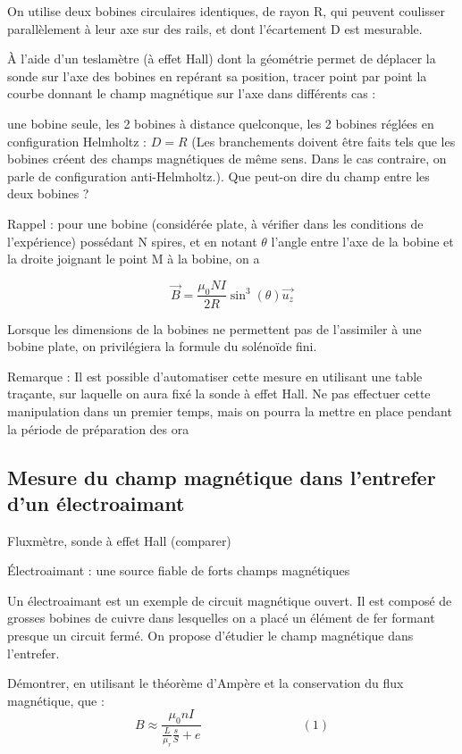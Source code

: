 \documentclass{article}%
\begin{document}
On utilise deux bobines circulaires identiques, de rayon R, qui peuvent coulisser parallèlement à leur axe sur des rails, et dont l'écartement D est mesurable.

À l'aide d'un teslamètre (à effet Hall) dont la géométrie permet de déplacer la sonde sur l'axe des bobines en repérant sa position, tracer point par point la courbe donnant le champ magnétique sur l'axe dans différents cas :

    une bobine seule,
    les 2 bobines à distance quelconque,
    les 2 bobines réglées en configuration Helmholtz : $D = R$ (Les branchements doivent être faits tels que les bobines créent des champs magnétiques de même sens. Dans le cas contraire, on parle de configuration anti-Helmholtz.). Que peut-on dire du champ entre les deux bobines ?

Rappel : pour une bobine (considérée plate, à vérifier dans les conditions de l'expérience) possédant N spires, et en notant $\theta$ l'angle entre l'axe de la bobine et la droite joignant le point M à la bobine, on a

\[\vec B = \frac{\mu_0 NI}{2 R}\sin^3(\theta) \vec{u_z}\]

Lorsque les dimensions de la bobines ne permettent pas de l'assimiler à une bobine plate, on privilégiera la formule du solénoïde fini.

Remarque : Il est possible d'automatiser cette mesure en utilisant une table traçante, sur laquelle on aura fixé la sonde à effet Hall. Ne pas effectuer cette manipulation dans un premier temps, mais on pourra la mettre en place pendant la période de préparation des ora

\subsection{Mesure du champ magnétique dans l'entrefer d'un électroaimant}
Fluxmètre, sonde à effet Hall (comparer)

Électroaimant : une source fiable de forts champs magnétiques

Un électroaimant est un exemple de circuit magnétique ouvert. Il est composé de grosses bobines de cuivre dans lesquelles on a placé un élément de fer formant presque un circuit fermé. On propose d'étudier le champ magnétique dans l'entrefer.

Démontrer, en utilisant le théorème d'Ampère et la conservation du flux magnétique, que :
\[ B \approx \frac{\mu_0 n I}{\frac{L}{\mu_r}\frac{s}{S} + e}  \qquad\qquad\qquad\qquad(1)\]
\end{document}
